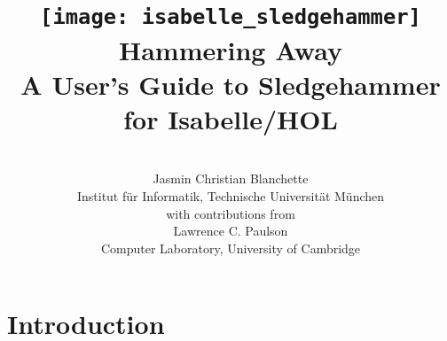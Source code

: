 \documentclass[a4paper,12pt]{article}
\begin{document}
\renewcommand\labelitemi{\raise.065ex\hbox{\small\textbullet}}


\title{\texttt{[image: isabelle\_sledgehammer]} \\[4ex]
Hammering Away \\[\smallskipamount]
\Large A User's Guide to Sledgehammer for Isabelle/HOL}
\author{\hbox{} \\
Jasmin Christian Blanchette \\
{\normalsize Institut f\"ur Informatik, Technische Universit\"at M\"unchen} \\[4\smallskipamount]
{\normalsize with contributions from} \\[4\smallskipamount]
Lawrence C. Paulson \\
{\normalsize Computer Laboratory, University of Cambridge} \\
\hbox{}}

\maketitle

\tableofcontents

\setlength{\parskip}{.7em plus .2em minus .1em}
\setlength{\parindent}{0pt}
\setlength{\abovedisplayskip}{\parskip}
\setlength{\abovedisplayshortskip}{.9\parskip}
\setlength{\belowdisplayskip}{\parskip}
\setlength{\belowdisplayshortskip}{.9\parskip}

\newenvironment{enum}%
    {\begin{list}{}{%
        \setlength{\topsep}{.1\parskip}%
        \setlength{\partopsep}{.1\parskip}%
        \setlength{\itemsep}{\parskip}%
        \advance\itemsep by-\parsep}}
    {\end{list}}

\def\pre{\begingroup\vskip0pt plus1ex\advance\leftskip by\leftmargin
\advance\rightskip by\leftmargin}
\def\post{\vskip0pt plus1ex\endgroup}

\def\prew{\pre\advance\rightskip by-\leftmargin}
\def\postw{\post}

\section{Introduction}
\label{introduction}
\end{document}
